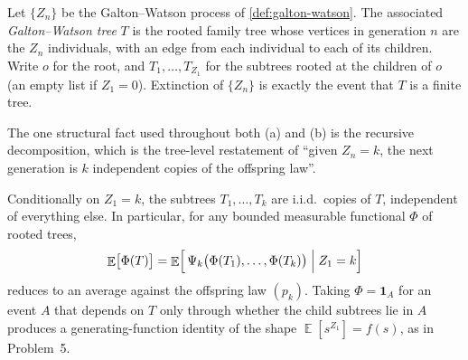 \documentclass[11pt,a4paper]{article}
\DeclareMathOperator{\E}{\mathbb{E}}
\begin{document}
\begin{center}
\end{center}

\begin{definition}
\label{def:gw-tree}
Let \(\{Z_n\}\) be the Galton--Watson process of \cref{def:galton-watson}. The associated \emph{Galton--Watson tree} \(T\) is the rooted family tree whose vertices in generation \(n\) are the \(Z_n\) individuals, with an edge from each individual to each of its children. Write \(o\) for the root, and \(T_1,\dots,T_{Z_1}\) for the subtrees rooted at the children of \(o\) (an empty list if \(Z_1=0\)). Extinction of \(\{Z_n\}\) is exactly the event that \(T\) is a finite tree.
\end{definition}

The one structural fact used throughout both (a) and (b) is the recursive decomposition, which is the tree-level restatement of ``given \(Z_n=k\), the next generation is \(k\) independent copies of the offspring law''.

\begin{proposition}
\label{prop:gw-tree-split}
Conditionally on \(Z_1=k\), the subtrees \(T_1,\dots,T_k\) are i.i.d.\ copies of \(T\), independent of everything else. In particular, for any bounded measurable functional \(\Phi\) of rooted trees,
\[
\E\bigl[\Phi(T)\bigr]
=
\E\Bigl[\,
\Psi_k\bigl(\Phi(T_1),\dots,\Phi(T_k)\bigr)
\Bigm| Z_1=k
\Bigr]
\]
reduces to an average against the offspring law \((p_k)\). Taking \(\Phi=\mathbf{1}_A\) for an event \(A\) that depends on \(T\) only through whether the child subtrees lie in \(A\) produces a generating-function identity of the shape \(\E[s^{Z_1}]=f(s)\), as in Problem~5.
\end{proposition}
\end{document}
